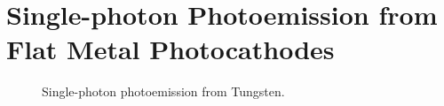 \section{Single-photon Photoemission from Flat Metal Photocathodes}

\begin{figure}
  \centering
  
  \caption[Single-photon photoemission from Tungsten]{
    Single-photon photoemission from Tungsten.
  }
  \label{fig:single_photon_tungsten}
\end{figure}


